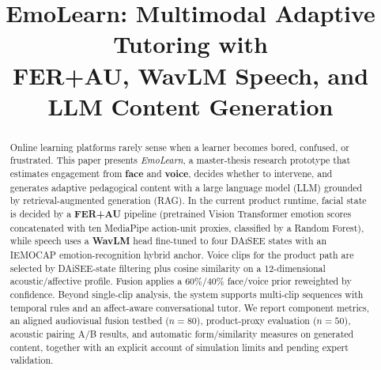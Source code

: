 \documentclass[conference]{IEEEtran}
\begin{document}
\title{EmoLearn: Multimodal Adaptive Tutoring with\\
FER+AU, WavLM Speech, and LLM Content Generation}

\author{
\and
{}
}

\maketitle

\begin{abstract}
Online learning platforms rarely sense when a learner becomes bored, confused,
or frustrated. This paper presents \textit{EmoLearn}, a master-thesis research
prototype that estimates engagement from \textbf{face} and \textbf{voice},
decides whether to intervene, and generates adaptive pedagogical content with a
large language model (LLM) grounded by retrieval-augmented generation (RAG).
In the current product runtime, facial state is decided by a \textbf{FER+AU}
pipeline (pretrained Vision Transformer emotion scores concatenated with ten
MediaPipe action-unit proxies, classified by a Random Forest), while speech uses
a \textbf{WavLM} head fine-tuned to four \textsc{DAiSEE} states with an
IEMOCAP emotion-recognition hybrid anchor. Voice clips for the product path are
selected by DAiSEE-state filtering plus cosine similarity on a 12-dimensional
acoustic/affective profile. Fusion applies a $60\%/40\%$ face/voice prior
reweighted by confidence. Beyond single-clip analysis, the system supports
multi-clip sequences with temporal rules and an affect-aware conversational
tutor. We report component metrics, an aligned audiovisual fusion testbed
($n{=}80$), product-proxy evaluation ($n{=}50$), acoustic pairing A/B results,
and automatic form/similarity measures on generated content, together with an
explicit account of simulation limits and pending expert validation.
\end{abstract}
\end{document}
